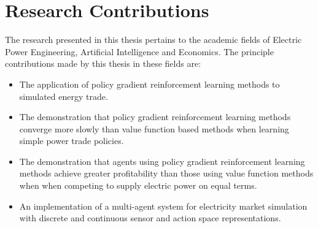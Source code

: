 
%

\section{Research Contributions}
The research presented in this thesis pertains to the academic fields of
Electric Power Engineering, Artificial Intelligence and Economics.  The
principle contributions made by this thesis in these fields are:

\begin{itemize}
  \item The application of policy gradient reinforcement learning methods to
  simulated energy trade.
  \item The demonstration that policy gradient reinforcement learning
  methods converge more slowly than value function based methods when learning
  simple power trade policies.
  \item The demonstration that agents using policy gradient reinforcement
  learning methods achieve greater profitability than those using value
  function methods when when competing to supply electric power on equal terms.
  \item An implementation of a multi-agent system for electricity market
  simulation with discrete and continuous sensor and action space
  representations.
\end{itemize}

